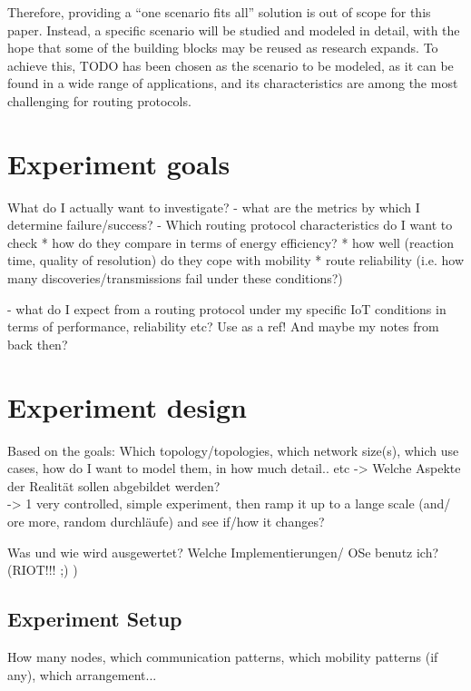 \documentclass{acm_proc_article-sp}
\begin{document}
Therefore, providing a ``one scenario fits all'' solution is out of scope for this paper. Instead, a specific scenario will be studied and modeled in detail, with the hope that some of the building blocks may be reused as research expands.
To achieve this, TODO has been chosen as the scenario to be modeled, as it can be found in a wide range of applications, and its characteristics are among the most challenging for routing protocols.


\section{Experiment goals}
\label{sec:Goals}
What do I actually want to investigate?
- what are the metrics by which I determine failure/success?
- Which routing protocol characteristics do I want to check
    * how do they compare in terms of energy efficiency?
    * how well (reaction time, quality of resolution) do they cope with mobility
    * route reliability (i.e. how many discoveries/transmissions fail under these conditions?)

- what do I expect from a routing protocol under my specific IoT conditions in terms of performance, reliability etc?
Use \cite{RFC-2501} as a ref! And maybe my notes from back then?

\section{Experiment design}
\label{sec:Design}
Based on the goals: Which topology/topologies, which network size(s), which use cases, how do I want to model them, in how much detail.. etc -> Welche Aspekte der Realität sollen abgebildet werden?\\
-> 1 very controlled, simple experiment, then ramp it up to a lange scale (and/ ore more, random durchläufe) and see if/how it changes?

Was und wie wird ausgewertet? Welche Implementierungen/ OSe benutz ich? (RIOT!!! ;) )

\subsection{Experiment Setup}
\label{subsec:setup}
How many nodes, which communication patterns, which mobility patterns (if any), which arrangement...
\end{document}
